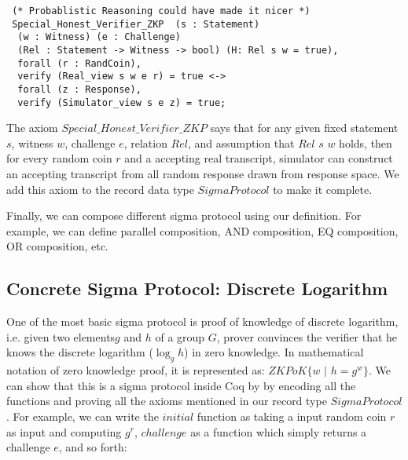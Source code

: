 \begin{verbatim}
 (* Probablistic Reasoning could have made it nicer *)
 Special_Honest_Verifier_ZKP  (s : Statement) 
  (w : Witness) (e : Challenge) 
  (Rel : Statement -> Witness -> bool) (H: Rel s w = true),
  forall (r : RandCoin), 
  verify (Real_view s w e r) = true <->
  forall (z : Response), 
  verify (Simulator_view s e z) = true;

\end{verbatim}

The axiom $Special\_Honest\_Verifier\_ZKP$ says that for any  given 
fixed statement $s$, witness $w$, challenge $e$, relation $Rel$, and assumption that $Rel$ $s$ $w$ holds, 
then for every random coin $r$  and a accepting real transcript, simulator can construct 
an accepting transcript from all random response drawn from response space. 
We add this axiom to the record data type $SigmaProtocol$ to make it 
complete. 

Finally, we can compose different  
sigma protocol using our definition. For example, 
we can define parallel composition, AND composition,
EQ composition, OR composition, etc.

\subsection{Concrete Sigma Protocol: Discrete Logarithm}
\label{sec:conc_sigma}
One of the most basic sigma protocol is proof of knowledge of 
discrete logarithm, i.e. given two elements$g$ and $h$ of 
a group $G$, prover convinces the verifier that 
he knows the discrete logarithm ($\log_g h$) in zero 
knowledge. In mathematical 
notation of zero knowledge proof, it is represented as:
$ZKPoK \lbrace w \text{ | } h = g^w \rbrace$. We can show 
that this is a sigma protocol inside Coq by 
by encoding all the  functions 
and proving all the axioms mentioned in 
our record type $SigmaProtocol$.  For example,
 we can write the $initial$ function as taking a input 
random coin $r$ as input and computing 
$g^r$, $challenge$ as a function which simply returns 
a challenge $e$, and so forth: 


\begin{displayquote}

$\text{initial r := } g^r}$  

$\text{challenge := } e$

$\text{response h w r e := } r + e \cdot w$

$\text{verify h a e z  := } g^z = a \cdot h^e$

$\text{simulator s e z := } (g^z \cdot h^{-e}, e, z)$

$\text{extractor }  $c_{1}$ $z_{1}$ $c_{2}$ $z_{2}$ := (z_{1} - z_{2}) \cdot (c_{2} - c_{1})^{-1}$

\end{displayquote}

